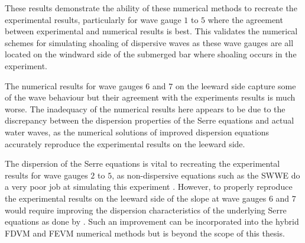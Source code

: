 These results demonstrate the ability of these numerical methods to recreate the experimental results, particularly for wave gauge $1$ to $5$ where the agreement between experimental and numerical results is best. This validates the numerical schemes for simulating shoaling of dispersive waves as these wave gauges are all located on the windward side of the submerged bar where shoaling occurs in the experiment. 

The numerical results for wave gauges $6$ and $7$ on the leeward side capture some of the wave behaviour but their agreement with the experiments results is much worse. The inadequacy of the numerical results here appears to be due to the discrepancy between the dispersion properties of the Serre equations and actual water waves, as the numerical solutions of improved dispersion equations \cite{Beji-Battjes-1994-1,Lannes-2013} accurately reproduce the experimental results on the leeward side.

The dispersion of the Serre equations is vital to recreating the experimental results for wave gauges $2$ to $5$, as non-dispersive equations such as the SWWE do a very poor job at simulating this experiment \cite{Pitt-2017-1725}. However, to properly reproduce the experimental results on the leeward side of the slope at wave gauges $6$ and $7$  would require improving the dispersion characteristics of the underlying Serre equations as done by \citet{Barthelemy-2004-315}. Such an improvement can be incorporated into the hybrid FDVM and FEVM numerical methods \cite{Zoppou-2014} but is beyond the scope of this thesis. 

